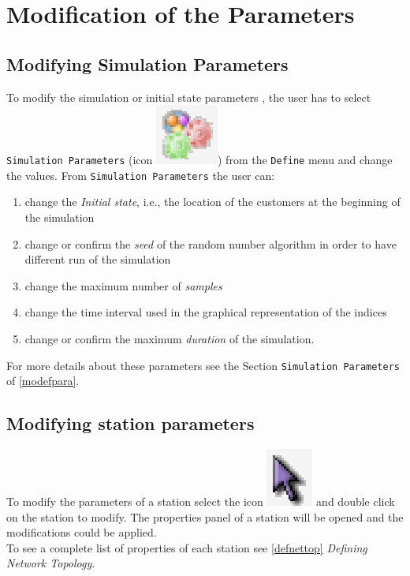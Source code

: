 \section{Modification of the Parameters}
\label{modifpa}

\subsection{Modifying Simulation Parameters}
To modify the simulation or initial state parameters , the user
has to select \texttt{Simulation Parameters} (icon
\includegraphics[scale=.4]{img/jsimg/defineSimulationParameters.eps})
from the \texttt{Define} menu and change the values. From
\texttt{Simulation Parameters} the user can:
\begin{enumerate} \item change the \emph{Initial state}, i.e., the location
of the customers at the beginning of the simulation \item change
or confirm the \emph{seed} of the random number algorithm in order
to have different run of the simulation \item change the maximum
number of \emph{samples} \item change the time interval used in
the graphical representation of the indices \item change or
confirm the maximum \emph{duration} of the simulation.
\end{enumerate}

\noindent For more details about these parameters see the Section
\texttt{Simulation Parameters} of \autoref{modefpara}.

\subsection{Modifying station parameters}
 To modify the
parameters of a station select the icon
\includegraphics[scale=.5]{img/jsimg/select} and double
click on the station to modify. The properties panel of a station
will be opened and the modifications could be applied.\\
To see a complete list of properties of each station see
\autoref{defnettop} \emph{Defining Network Topology}.

